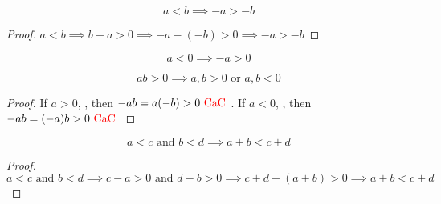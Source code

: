 \documentclass{report}
\begin{document}
\begin{theorem}
\begin{equation}
a<b\implies -a>-b
\end{equation}
\end{theorem}
\begin{proof}
 $a<b\implies b-a>0\implies -a-(-b)>0\implies -a>-b$
\end{proof}
\begin{corollary}
\begin{equation}
a<0\implies -a>0
\end{equation}
\end{corollary}
\begin{theorem}
\begin{equation}
ab>0\implies a,b>0\text{ or }a,b<0
\end{equation}
\begin{proof}
  If $a>0$, , then $-ab=a(-b)>0\text{ \textcolor{red}{CaC} }$. If $a<0$, , then $-ab=(-a)b>0\text{ \textcolor{red}{CaC} }$
\end{proof}
\end{theorem}
\begin{theorem}
\begin{equation}
a<c\text{ and }b<d\implies a+b<c+d
\end{equation}
\end{theorem}
\begin{proof}
 $a<c\text{ and }b<d\implies c-a>0\text{ and }d-b>0\implies c+d-(a+b)>0\implies a+b<c+d$
\end{proof}
\end{document}
